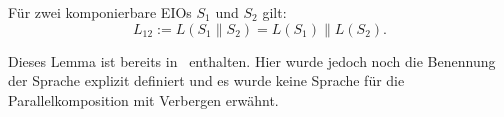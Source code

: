 \begin{lem}
  \label{LemmaSprache}
  Für zwei komponierbare EIOs $S_1$ und $S_2$ gilt: \[L_{12} := L(S_1\|S_2) =
  L(S_1)\|L(S_2).\]
\end{lem}

Dieses Lemma ist bereits in~\cite{Vogler2014EIO} enthalten. Hier wurde jedoch
noch die Benennung der Sprache explizit definiert und es wurde keine Sprache
für die Parallelkomposition mit Verbergen erwähnt.
